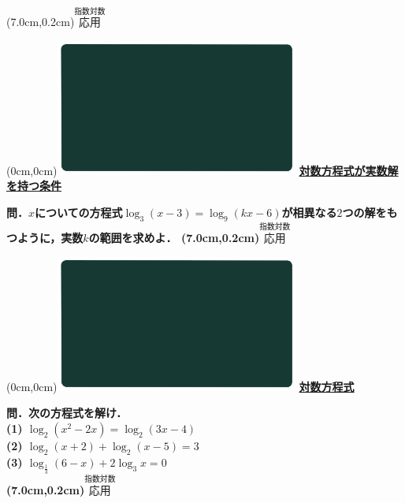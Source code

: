 \documentclass[10pt,
fleqn,
dvipdfmx,
uplatex
]{jsarticle}
\begin{document}
\at(7.0cm,0.2cm){\small\color{bradorange}$\overset{\text{指数対数}}{\text{応用}}$}


\newpage



\at(0cm,0cm){\includegraphics[width=8cm,bb=0 0 1920 1080]{./youtube/thumbnails/templates/smart_background/指数対数.jpeg}}
{\color{orange}\bf\boldmath\Large\underline{対数方程式が実数解を持つ条件}}\vspace{0.3zw}

\Large 
\bf\boldmath 問．$x$についての方程式$\log _3\left(x-3\right)=\log _9\left(kx-6\right)$が相異なる$2$つの解をもつように，実数$k$の範囲を求めよ．
\at(7.0cm,0.2cm){\small\color{bradorange}$\overset{\text{指数対数}}{\text{応用}}$}


\newpage



\at(0cm,0cm){\includegraphics[width=8cm,bb=0 0 1920 1080]{./youtube/thumbnails/templates/smart_background/指数対数.jpeg}}
{\color{orange}\bf\boldmath\huge\underline{対数方程式}}\vspace{0.3zw}

\large 
\bf\boldmath 問．次の方程式を解け．\\
(1)  $\log _2\left(x^2-2x\right)=\log _2\left(3x-4\right)$\\
(2)  $\log _2\left(x+2\right)+\log _2\left(x-5\right)=3$\\
(3)  $\log _{\frac{1}{3}}\left(6-x\right)+2\log _3x=0$\\

\at(7.0cm,0.2cm){\small\color{bradorange}$\overset{\text{指数対数}}{\text{応用}}$}
\end{document}
